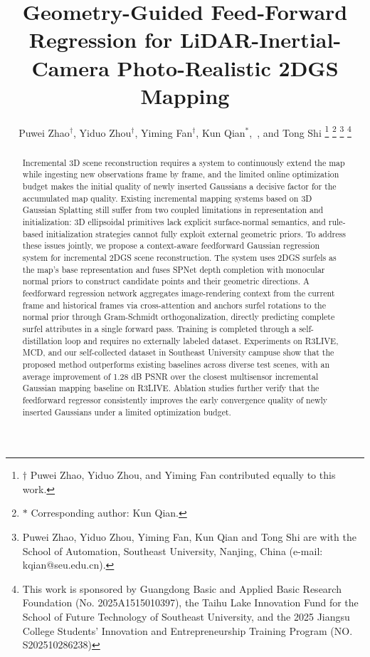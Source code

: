 \documentclass[lettersize,journal]{IEEEtran}
\begin{document}
\title{Geometry-Guided Feed-Forward Regression for LiDAR-Inertial-Camera Photo-Realistic 2DGS Mapping}
\author{Puwei Zhao$^{\dagger}$, Yiduo Zhou$^{\dagger}$, Yiming Fan$^{\dagger}$, Kun Qian$^{*}$,~, and Tong Shi%
\thanks{$\dagger$ Puwei Zhao, Yiduo Zhou, and Yiming Fan contributed equally to this work.}%
\thanks{$*$ Corresponding author: Kun Qian.}
\thanks{Puwei Zhao, Yiduo Zhou, Yiming Fan, Kun Qian and Tong Shi are with the School of Automation, Southeast University, Nanjing, China (e-mail: kqian@seu.edu.cn).}%
\thanks{This work is sponsored by Guangdong Basic and Applied Basic Research Foundation (No. 2025A1515010397), the Taihu Lake Innovation Fund for the School of Future Technology of Southeast University, and the 2025 Jiangsu College Students' Innovation and Entrepreneurship Training Program (NO. S202510286238)}}
\maketitle

\begin{abstract}
Incremental 3D scene reconstruction requires a system to continuously extend the map while ingesting new observations frame by frame, and the limited online optimization budget makes the initial quality of newly inserted Gaussians a decisive factor for the accumulated map quality. Existing incremental mapping systems based on 3D Gaussian Splatting still suffer from two coupled limitations in representation and initialization: 3D ellipsoidal primitives lack explicit surface-normal semantics, and rule-based initialization strategies cannot fully exploit external geometric priors. To address these issues jointly, we propose a context-aware feedforward Gaussian regression system for incremental 2DGS scene reconstruction. The system uses 2DGS surfels as the map's base representation and fuses SPNet depth completion with monocular normal priors to construct candidate points and their geometric directions. A feedforward regression network aggregates image-rendering context from the current frame and historical frames via cross-attention and anchors surfel rotations to the normal prior through Gram-Schmidt orthogonalization, directly predicting complete surfel attributes in a single forward pass. Training is completed through a self-distillation loop and requires no externally labeled dataset. Experiments on R3LIVE, MCD, and our self-collected dataset in Southeast University campuse show that the proposed method outperforms existing baselines across diverse test scenes, with an average improvement of 1.28 dB PSNR over the closest multisensor incremental Gaussian mapping baseline on R3LIVE. Ablation studies further verify that the feedforward regressor consistently improves the early convergence quality of newly inserted Gaussians under a limited optimization budget.
\end{abstract}
\end{document}
